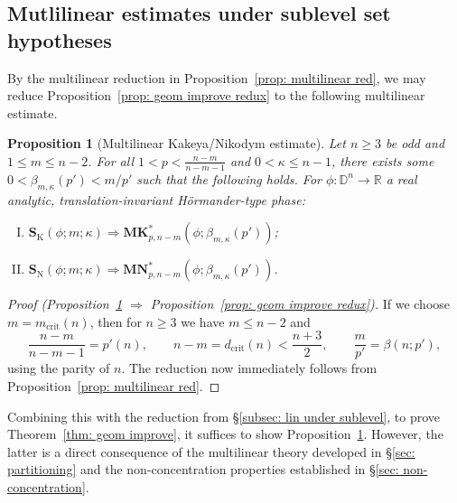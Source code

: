 \documentclass[reqno]{amsart}
\numberwithin{equation}{section}
\newcommand{\D}{\mathbb{D}}
\newcommand{\R}{\mathbb{R}}
\newcommand{\bK}{\mathbf{K}}
\newcommand{\bM}{\mathbf{M}}
\newcommand{\bN}{\mathbf{N}}
\newcommand{\bS}{\mathbf{S}}
\theoremstyle{plain}
\newtheorem{proposition}[theorem]{Proposition}
\theoremstyle{definition}
\newcommand{\tK}{\mathrm{K}}
\newcommand{\tN}{\mathrm{N}}
\newcommand{\crit}{\mathrm{crit}}
\begin{document}
\subsection{Mutlilinear estimates under sublevel set hypotheses} By the multilinear reduction in Proposition~\ref{prop: multilinear red}, we may reduce Proposition~\ref{prop: geom improve redux} to the following multilinear estimate. 

\begin{proposition}[Multilinear Kakeya/Nikodym estimate]\label{prop: multi Kak/Nik} Let $n \geq 3$ be odd and $1 \leq m \leq n-2$. For all $1 < p < \frac{n-m}{n-m-1}$ and $0 < \kappa \leq n-1$, there exists some $0 < \beta_{m,\kappa}(p') < m/p'$ such that the following holds. For $\phi \colon \D^n \to \R$ a real analytic, translation-invariant H\"ormander-type phase:
\begin{enumerate}[I)]
    \item $\bS_{\tK}(\phi; m; \kappa) \Rightarrow \bM\bK_{p, n-m}^*(\phi; \beta_{m,\kappa}(p'))$;
    \item $\bS_{\tN}(\phi; m; \kappa) \Rightarrow \bM\bN_{p, n-m}^*(\phi; \beta_{m,\kappa}(p'))$.
\end{enumerate}
\end{proposition}

\begin{proof}[Proof (Proposition~\ref{prop: multi Kak/Nik} $\Rightarrow$ Proposition~\ref{prop: geom improve redux})] If we choose $m = m_{\crit}(n)$, then for $n \geq 3$ we have $m \leq n - 2$ and
\begin{equation*}
  \frac{n-m}{n-m-1} = p'(n),\qquad  n - m = d_{\crit}(n)  < \frac{n+3}{2}, \qquad \frac{m}{p'} = \beta(n; p'),
\end{equation*}
using the parity of $n$. The reduction now immediately follows from Proposition~\ref{prop: multilinear red}.
\end{proof}


Combining this with the reduction from \S\ref{subsec: lin under sublevel}, to prove Theorem~\ref{thm: geom improve}, it suffices to show Proposition~\ref{prop: multi Kak/Nik}. However, the latter is a direct consequence of the multilinear theory developed in \S\ref{sec: partitioning} and the non-concentration properties established in \S\ref{sec: non-concentration}. 
\end{document}
